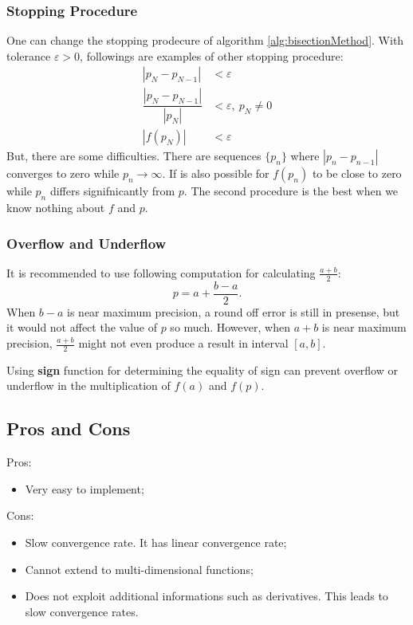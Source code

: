         \subsubsection{Stopping Procedure}
            One can change the stopping prodecure of algorithm \ref{alg:bisectionMethod}. With tolerance $\varepsilon > 0$,
            followings are examples of other stopping procedure:
            \begin{align}
                |p_N - p_{N-1}| &< \varepsilon \\
                \dfrac{|p_N - p_{N-1}|}{|p_N|} &< \varepsilon,\ p_N \neq 0 \\
                |f(p_N)| &< \varepsilon
            \end{align}
            But, there are some difficulties. There are sequences $\{p_n\}$ where $|p_n - p_{n-1}|$ converges to zero while $p_n\to\infty$.
            If is also possible for $f(p_n)$ to be close to zero while $p_n$ differs signifnicantly from $p$.
            The second procedure is the best when we know nothing about $f$ and $p$.

        \subsubsection{Overflow and Underflow}
            It is recommended to use following computation for calculating $\frac{a + b}{2}$:
            \begin{equation}
                p = a + \frac{b - a}{2}.
            \end{equation}
            When $b - a$ is near maximum precision, a round off error is still in presense, but it would not affect the value of $p$ so much.
            However, when $a + b$ is near maximum precision, $\frac{a+b}{2}$ might not even produce a result in interval $[a,b]$.

            Using \textbf{sign} function for determining the equality of sign can prevent overflow or underflow in the multiplication of $f(a)$ and $f(p)$.
    \subsection{Pros and Cons}
        Pros:
        \begin{itemize}
            \item Very easy to implement;
        \end{itemize}
        Cons:
        \begin{itemize}
            \item Slow convergence rate. It has linear convergence rate;
            \item Cannot extend to multi-dimensional functions;
            \item Does not exploit additional informations such as derivatives. This leads to slow convergence rates.
        \end{itemize}
